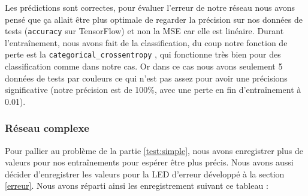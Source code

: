 \documentclass[a4paper,11pt]{article}
\begin{document}
Les prédictions sont correctes, pour évaluer l'erreur de notre réseau nous avons pensé que ça allait être plus optimale de regarder la précision sur nos données de tests (\texttt{accuracy} sur TensorFlow) et non la MSE car elle est linéaire. Durant l'entraînement, nous avons fait de la classification, du coup notre fonction de perte est la \texttt{categorical\_crossentropy} \cite{tensorflow}, qui fonctionne très bien pour des classification comme dans notre cas. Or dans ce cas nous avons seulement 5 données de tests par couleurs ce qui n'est pas assez pour avoir une précisions significative (notre précision est de 100\%, avec une perte en fin d'entraînement à 0.01). 

\subsubsection{Réseau complexe}
Pour pallier au problème de la partie \ref{test:simple}, nous avons enregistrer plus de valeurs pour nos entraînements pour espérer être plus précis. Nous avons aussi décider d'enregistrer les valeurs pour la LED d'erreur développé à la section \ref{erreur}. Nous avons réparti ainsi les enregistrement suivant ce tableau : 
\begin{table}[H]
\centering
{}
\caption{Répartition de nos enregistrements}
\end{table}
\end{document}
